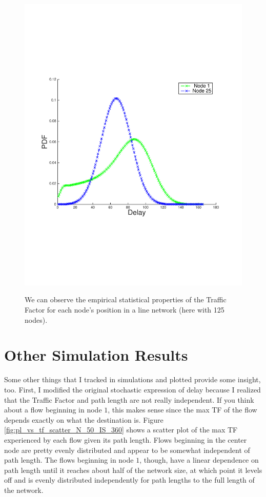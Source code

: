 \documentclass[conference]{IEEEtran}
\begin{document}
\begin{figure}
\begin{centering}
{    		\includegraphics[scale=0.4, clip=true, trim=15mm 65mm 20mm 65mm]{figs_exp_vs_anal/num_nodes_50/image_size_360/timeliness_165/line_net/anal_delay_pdf_2.pdf}
		\label{fig:delay_dist_anal_2_N_50_IS_360}
		}
	\caption{We can observe the empirical statistical properties of the Traffic Factor for each node's position in a line network (here with 125 nodes).}
	\label{fig:TF_empirical_stats_each_node_line_net}
\end{centering}
\end{figure}

\section{Other Simulation Results}

Some other things that I tracked in simulations and plotted provide some insight, too.  First, I modified the original stochastic expression of delay because I realized that the Traffic Factor and path length are not really independent.  If you think about a flow beginning in node $1$, this makes sense since the max TF of the flow depends exactly on what the destination is.  Figure \ref{fig:pl_vs_tf_scatter_N_50_IS_360} shows a scatter plot of the max TF experienced by each flow given its path length.  Flows beginning in the center node are pretty evenly distributed and appear to be somewhat independent of path length.  The flows beginning in node $1$, though, have a linear dependence on path length until it reaches about half of the network size, at which point it levels off and is evenly distributed independently for path lengths to the full length of the network.  
\end{document}
